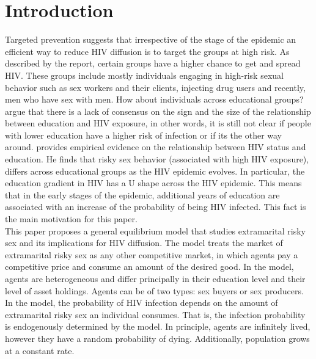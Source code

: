 \section{Introduction}\label{sec1}

Targeted prevention suggests that irrespective of the stage of the epidemic an efficient way to reduce HIV diffusion is to target the groups at high risk. As described by the \cite{report2} report, certain groups have a higher chance to get and spread HIV. These groups include mostly individuals engaging in high-risk sexual behavior such as sex workers and their clients, injecting drug users and recently, men who have sex with men. How about individuals across educational groups?\\
\cite{beegle} argue that there is a lack of consensus on the sign and the size of the relationship between education and HIV exposure, in other words, it is still not clear if people with lower education have a higher risk of infection or if its the other way around. \cite{raul} provides empirical evidence on the relationship between HIV status and education. He finds that risky sex behavior (associated with high HIV exposure), differs across educational groups as the HIV epidemic evolves. In particular, the education gradient in HIV has a U shape across the HIV epidemic. This means that in the early stages of the epidemic, additional years of education are associated with an increase of the probability of being HIV infected. This fact is the main motivation for this paper.   \\
This paper proposes a general equilibrium model that studies extramarital risky sex and its implications for HIV diffusion. The model treats the market of extramarital risky sex as any other competitive market, in which agents pay a competitive price and consume an amount of the desired good. In the model, agents are heterogeneous and differ principally in their education level and their level of asset holdings. Agents can be of two types: sex buyers or sex producers. In the model, the probability of HIV infection depends on the amount of extramarital risky sex an individual consumes. That is, the infection probability is endogenously determined by the model. In principle, agents are infinitely lived, however they have a random  probability of dying. Additionally, population grows at a constant rate.\\